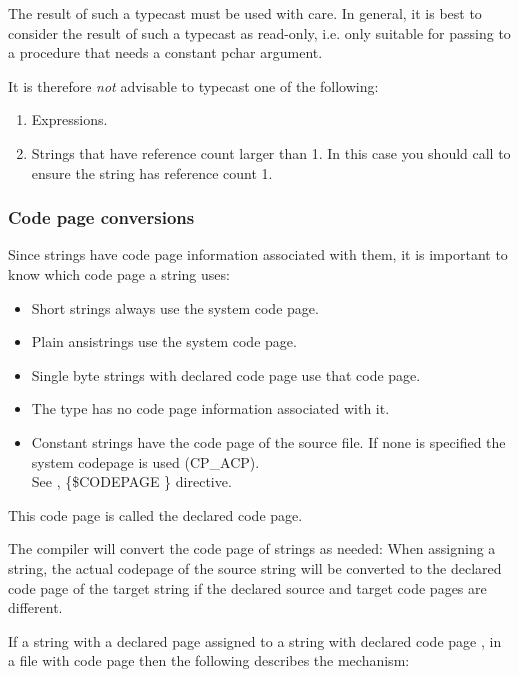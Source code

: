 The result of such a typecast must be used with care. In general, it is best
to consider the result of such a typecast as read-only, i.e. only suitable for
passing to a procedure that needs a constant pchar argument.

It is therefore {\em not} advisable to typecast one of the following:
\begin{enumerate}
\item Expressions.
\item Strings that have reference count larger than 1.
In this case you should call  to ensure the 
string has reference count 1.
\end{enumerate}

\subsubsection{Code page conversions}
Since strings have code page information associated with them, it is important to know which code page a string uses:
\begin{itemize}
\item Short strings always use the system code page.
\item Plain ansistrings use the system code page.
\item Single byte strings with declared code page use that code page.
\item The  type has no code page information associated with it.
\item Constant strings have the code page of the source file. 
If none is specified the system codepage is used (CP\_ACP).\\
See \progref, \{\$CODEPAGE \} directive.
\end{itemize}
This code page is called the declared code page.

The compiler will convert the code page of strings as needed: When assigning a string,
the actual codepage of the source string will be converted to the declared code 
page of the target string if the declared source and target code pages are different.

If a string with a declared page  assigned to a string with
declared code page , in a file with code page  then
the following describes the mechanism:

